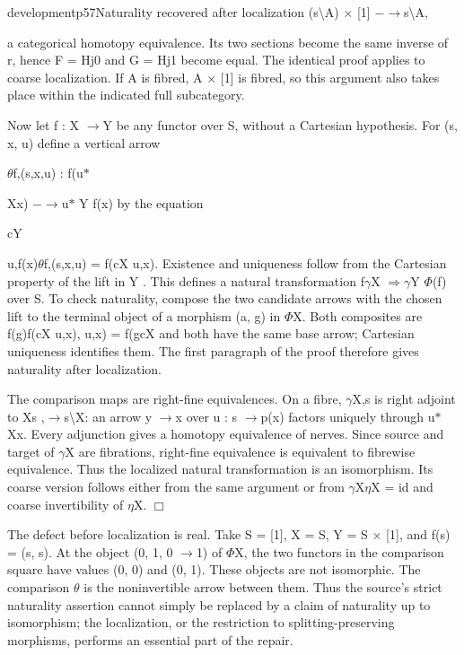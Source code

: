 \begin{dcomment}{development}{p57}{Naturality recovered after localization}
(s\textbackslash{}A) \ensuremath{\times} [1] \ensuremath{-}\ensuremath{\to}s\textbackslash{}A,

a categorical homotopy equivalence. Its two sections become the same inverse of r, hence F = Hj0 and G = Hj1 become equal. The identical proof applies to coarse localization. If A is fibred, A \ensuremath{\times} [1] is fibred, so this argument also takes place within the indicated full subcategory.

Now let f : X \ensuremath{\to}Y be any functor over S, without a Cartesian hypothesis. For (s, x, u) define a vertical arrow

\ensuremath{\theta}f,(s,x,u) : f(u\ensuremath{*}

Xx) \ensuremath{-}\ensuremath{\to}u\ensuremath{*} Y f(x) by the equation

cY

u,f(x)\ensuremath{\theta}f,(s,x,u) = f(cX u,x). Existence and uniqueness follow from the Cartesian property of the lift in Y . This defines a natural transformation f\ensuremath{\gamma}X \ensuremath{\Rightarrow}\ensuremath{\gamma}Y \ensuremath{\Phi}(f) over S. To check naturality, compose the two candidate arrows with the chosen lift to the terminal object of a morphism (a, g) in \ensuremath{\Phi}X. Both composites are f(g)f(cX u,x), u,x) = f(gcX and both have the same base arrow; Cartesian uniqueness identifies them. The first paragraph of the proof therefore gives naturality after localization.

The comparison maps are right-fine equivalences. On a fibre, \ensuremath{\gamma}X,s is right adjoint to Xs ,\ensuremath{\to}s\textbackslash{}X: an arrow y \ensuremath{\to}x over u : s \ensuremath{\to}p(x) factors uniquely through u\ensuremath{*} Xx. Every adjunction gives a homotopy equivalence of nerves. Since source and target of \ensuremath{\gamma}X are fibrations, right-fine equivalence is equivalent to fibrewise equivalence. Thus the localized natural transformation is an isomorphism. Its coarse version follows either from the same argument or from \ensuremath{\gamma}X\ensuremath{\eta}X = id and coarse invertibility of \ensuremath{\eta}X. \ensuremath{\Box}

The defect before localization is real. Take S = [1], X = S, Y = S \ensuremath{\times} [1], and f(s) = (s, s). At the object (0, 1, 0 \ensuremath{\to}1) of \ensuremath{\Phi}X, the two functors in the comparison square have values (0, 0) and (0, 1). These objects are not isomorphic. The comparison \ensuremath{\theta} is the noninvertible arrow between them. Thus the source’s strict naturality assertion cannot simply be replaced by a claim of naturality up to isomorphism; the localization, or the restriction to splitting-preserving morphisms, performs an essential part of the repair.

\end{dcomment}

